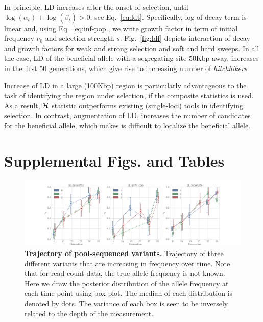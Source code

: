 \documentclass[11pt]{article}
\begin{document}
In principle, LD increases after the onset of selection, until $\log(\alpha_t) 
+\log(\beta_t) 
>0$, see Eq.~\ref{eq:ldt}. 
Specifically, log of decay term is linear and, using 
Eq.~\ref{eq:inf-pop}, we write growth 
factor in term of initial frequency $\nu_0$ and selection strength $s$. 
Fig.~\ref{fig:ldf} depicts interaction of decay and growth factors for weak and 
strong selection and soft and hard sweeps. In all the case, LD of the 
beneficial allele with a segregating site 50Kbp away, increases in the first 50 
generations, which give rise to increasing number of \emph{hitchhikers}. 

Increase of LD in a large (100Kbp) region is particularly advantageous to the 
task of identifying the region under selection, if the composite statistics is 
used. As a result, ${\cal H}$ statistic outperforms existing (single-loci) tools in 
identifying selection. In contrast, augmentation of LD, increases the 
number 
of candidates for 
the beneficial allele, which makes is difficult to localize the beneficial 
allele.

\newpage
\section{Supplemental Figs. and Tables}
\begin{figure}[H]
	\centering
	\includegraphics[width=\textwidth]{figures/trajectoryReal.pdf}
	\caption{{\bf Trajectory of pool-sequenced variants.}
          Trajectory of three different variants that are increasing
          in frequency over time. Note that for read count data, the
          true allele frequency is not known. Here we draw the
          posterior distribution of the allele frequency at each time
          point using box plot. The median of each distribution is
          denoted by dots. The variance of each box is seen to be
          inversely related to the depth of the measurement. }
	\label{fig:trajectoryReal}
\end{figure}
\end{document}
